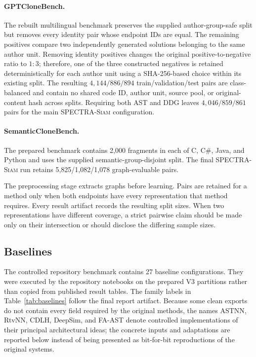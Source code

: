 \documentclass[authoryear,final,5p,times,twocolumn]{elsarticle}
\newcommand{\method}{\textsc{SPECTRA-Siam}}
\newcommand{\added}[1]{{\color{green!50!black}#1}}
\theoremstyle{plain}
\begin{document}
\paragraph{GPTCloneBench.}
\added{The rebuilt multilingual benchmark preserves the supplied author-group-safe
split but removes every identity pair whose endpoint IDs are equal. The
remaining positives compare two independently generated solutions belonging to
the same author unit. Removing identity positives changes the original
positive-to-negative ratio to $1{:}3$; therefore, one of the three constructed
negatives is retained deterministically for each author unit using a
SHA-256-based choice within its existing split. The resulting
$4{,}144/886/894$ train/validation/test pairs are class-balanced and contain no
shared code ID, author unit, source pool, or original-content hash across
splits. Requiring both AST and DDG leaves $4{,}046/859/861$ pairs for the main
\method{} configuration.}

\paragraph{SemanticCloneBench.}
The prepared benchmark contains 2,000 fragments in each of C, C\#, Java, and
Python and uses the supplied semantic-group-disjoint split. The final \method{}
run retains 5,825/1,082/1,078 graph-evaluable pairs.

The preprocessing stage extracts graphs before learning. Pairs are retained for
a method only when both endpoints have every representation that method requires.
Every result artifact records the resulting split sizes. When two representations
have different coverage, a strict pairwise claim should be made only on their
intersection or should disclose the differing sample sizes.

\subsection{Baselines}
\label{sec:baselines}
\label{sec:spectral_baselines}

\added{The controlled repository benchmark contains 27 baseline configurations.
They were executed by the repository notebooks on the prepared V3 partitions
rather than copied from published result tables. The family labels in
Table~\ref{tab:baselines} follow the final report artifact. Because some
clean exports do not contain every field required by the original methods, the
names ASTNN, RtvNN, CDLH, DeepSim, and FA-AST denote controlled implementations
of their principal architectural ideas; the concrete inputs and adaptations are
reported below instead of being presented as bit-for-bit reproductions of the
original systems.}
\end{document}
